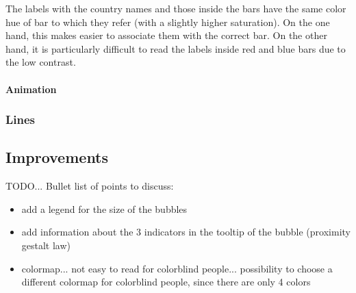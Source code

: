 The labels with the country names and those inside the bars have the same color hue of bar to which they refer (with a slightly higher saturation).
On the one hand, this makes easier to associate them with the correct bar.
On the other hand, it is particularly difficult to read the labels inside red and blue bars due to the low contrast.

\paragraph{Animation}



\subsubsection{Lines}


\subsection{Improvements}
TODO...
Bullet list of points to discuss:
\begin{itemize}
    \item add a legend for the size of the bubbles
    \item add information about the 3 indicators in the tooltip of the bubble (proximity gestalt law)

    \item colormap... not easy to read for colorblind people... possibility to choose a different colormap for colorblind people, since there are only 4 colors
\end{itemize}
